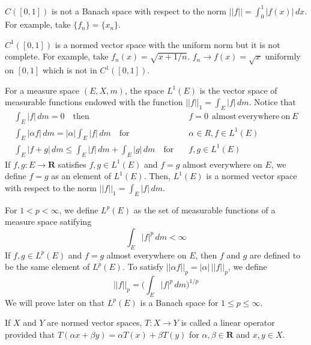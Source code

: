 \vspace{2ex}
\begin{rmk}
$C([0,1])$ is not a Banach space with respect to the norm $||f||=\int ^{1}_{0}|f(x)|\,dx$. For example, take $\{f_{n}\}=\{x_{n}\}$. 
\end{rmk}
\vspace{2ex}
\begin{rmk}
$C^{1}([0,1])$ is a normed vector space with the uniform norm but it is not complete. For example, take $f_{n}(x)=\sqrt{x+1/n}$. $f_{n}\rightarrow f(x)=\sqrt{x}$ uniformly on $[0,1]$ which is not in $C^{1}([0,1])$.
\end{rmk}
\vspace{2ex}
\begin{defi}
For a measure space $(E,X,m)$, the space $L^{1}(E)$ is the vector space of measurable functions endowed with the function $||f||_{1}=\int _{E}|f|\,dm$. Notice that 
\begin{align*}
\int _{E}|f|\,d m=0\quad \mathrm{then}&\quad f=0\ \mathrm{\ almost\ everywhere\ on\ }E\\
\int _{E}|\alpha f|\,dm=|\alpha |\int _{E}|f|\,d m\quad\mathrm{for}&\quad\alpha \in R,f\in L^{1}(E)\\
\int _{E}|f+g|\,d m\leq \int _{E}|f|\,d m+\int _{E}|g|\,d m\quad\mathrm{for}&\quad f,g\in L^{1}(E)
\end{align*}
If $f,g:E\rightarrow {\bm R}$ satisfies $f,g\in L^{1}(E)$ and $f=g$ almost everywhere on $E$, we define $f=g$ as an element of $L^{1}(E)$. Then, $L^{1}(E)$ is a normed vector space with respect to the norm $||f||_{1}=\int _{E}|f|\,d m$.
\end{defi}
\vspace{2ex}
\begin{defi}
For $1<p<\infty $, we define $L^{p}(E)$ as the set of measurable functions of a measure space satifying 
\[\int _{E}|f|^{p}\,dm<\infty \]
If $f,g\in L^{p}(E)$ and $f=g$ almost everywhere on $E$, then $f$ and $g$ are defined to be the same element of $L^{p}(E)$. To satisfy $||\alpha f||_{p}=|\alpha |\,||f||_{p}$, we define
\[||f||_{p}=\Big(\int _{E}|f|^{p}\, dm\Big)^{1/p}\]
We will prove later on that $L^{p}(E)$ is a Banach space for $1\leq p\leq \infty $.
\end{defi}
\vspace{2ex}
\begin{defi}
If $X$ and $Y$ are normed vector spaces, $T:X\rightarrow Y$ is called a linear operator provided that $T(\alpha x+\beta y)=\alpha T(x)+\beta T(y)$ for $\alpha ,\beta \in {\bm R}$ and $x,y\in X$. 
\end{defi}
